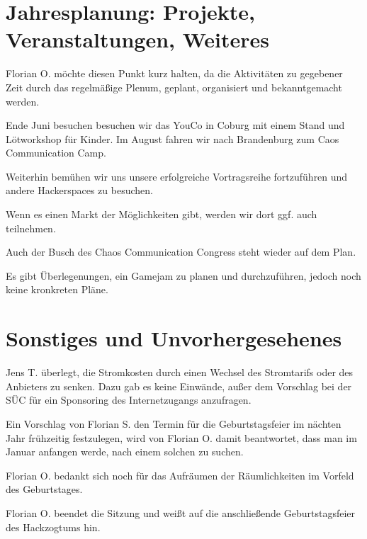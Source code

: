 \section{Jahresplanung: Projekte, Veranstaltungen, Weiteres}
Florian O. möchte diesen Punkt kurz halten, da die Aktivitäten zu gegebener Zeit durch das regelmäßige Plenum, geplant, organisiert und bekanntgemacht werden. 

Ende Juni besuchen besuchen wir das YouCo in Coburg mit einem Stand und Lötworkshop für Kinder.
Im August fahren wir nach Brandenburg zum Caos Communication Camp.

Weiterhin bemühen wir uns unsere erfolgreiche Vortragsreihe fortzuführen und andere Hackerspaces zu besuchen.

Wenn es einen Markt der Möglichkeiten gibt, werden wir dort ggf. auch teilnehmen.

Auch der Busch des Chaos Communication Congress steht wieder auf dem Plan.

Es gibt Überlegenungen, ein Gamejam zu planen und durchzuführen, jedoch noch keine kronkreten Pläne.

 
\section{Sonstiges und Unvorhergesehenes}
Jens T. überlegt, die Stromkosten durch einen Wechsel des Stromtarifs oder des Anbieters zu senken.
Dazu gab es keine Einwände, außer dem Vorschlag bei der SÜC für ein Sponsoring des Internetzugangs anzufragen.

Ein Vorschlag von Florian S. den Termin für die Geburtstagsfeier im nächten Jahr frühzeitig festzulegen, wird von Florian O. damit beantwortet, dass man im Januar anfangen werde, nach einem solchen zu suchen.

Florian O. bedankt sich noch für das Aufräumen der Räumlichkeiten im Vorfeld des Geburtstages.

Florian O. beendet die Sitzung und weißt auf die anschließende Geburtstagsfeier des Hackzogtums hin. 
